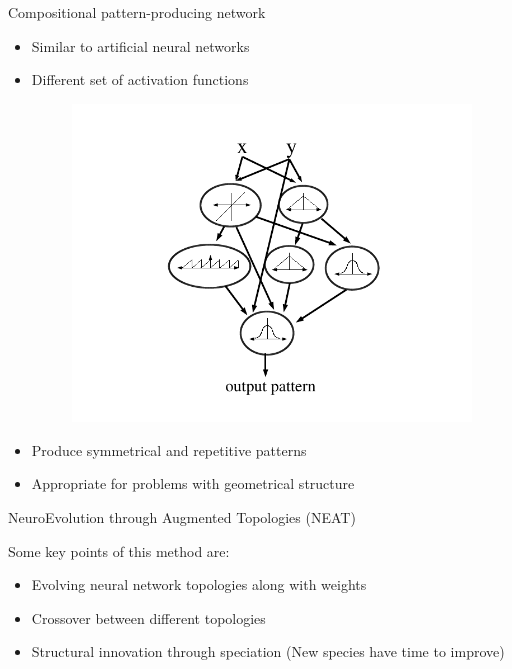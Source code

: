 \documentclass{beamer}
\begin{document}
\begin{frame}{Compositional pattern-producing network~\cite{stanley2007compositional}}
\begin{itemize}
\item Similar to artificial neural networks
\item Different set of activation functions
\begin{figure}
\begin{center}
\includegraphics[scale=0.25]{figures/cppnNetwork.png}
\end{center}
\end{figure}
\item Produce symmetrical and repetitive patterns
\item Appropriate for problems with geometrical structure
\end{itemize}
\end{frame}


\begin{frame}{NeuroEvolution through Augmented Topologies (NEAT)~\cite{stanley2002evolving}}
\begin{block}{Some key points of this method are:}
\begin{itemize}
\item Evolving neural network topologies along with weights
\item Crossover between different topologies
\item Structural innovation through speciation (New species have time to improve)
\end{itemize}
\end{block}
\end{frame}
\end{document}
